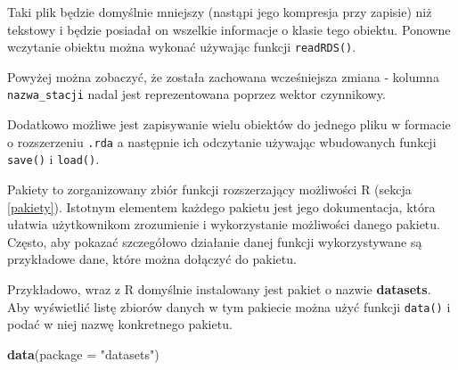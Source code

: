 \documentclass[paper=6in:9in,pagesize=pdftex,headinclude=on,footinclude=on,10pt]{scrbook}
\makeatletter
\newenvironment{Shaded}{\begin{snugshade}}{\end{snugshade}}
\newcommand{\CommentTok}[1]{\textcolor[rgb]{0.56,0.35,0.01}{\textit{#1}}}
\newcommand{\DataTypeTok}[1]{\textcolor[rgb]{0.13,0.29,0.53}{#1}}
\newcommand{\KeywordTok}[1]{\textcolor[rgb]{0.13,0.29,0.53}{\textbf{#1}}}
\newcommand{\NormalTok}[1]{#1}
\newcommand{\StringTok}[1]{\textcolor[rgb]{0.31,0.60,0.02}{#1}}
\newenvironment{kframe}{%
\medskip{}
\setlength{\fboxsep}{.8em}
 \def\at@end@of@kframe{}%
 \ifinner\ifhmode%
  \def\at@end@of@kframe{\end{minipage}}%
  \begin{minipage}{\columnwidth}%
 \fi\fi%
 \def\FrameCommand##1{\hskip\@totalleftmargin \hskip-\fboxsep
 \colorbox{shadecolor}{##1}\hskip-\fboxsep
     \hskip-\linewidth \hskip-\@totalleftmargin \hskip\columnwidth}%
 \MakeFramed {\advance\hsize-\width
   \@totalleftmargin\z@ \linewidth\hsize
   \@setminipage}}%
 {\par\unskip\endMakeFramed%
 \at@end@of@kframe}
\newenvironment{rmdblock}[1]
  {
  \begin{itemize}
  \renewcommand{\labelitemi}{
    \raisebox{-.7\height}[0pt][0pt]{
      {\setkeys{Gin}{width=3em,keepaspectratio}\texttt{[image: images/\#1]}}
    }
  }
  \setlength{\fboxsep}{1em}
  \begin{kframe}
  \item
  }
  {
  \end{kframe}
  \end{itemize}
  }
\newenvironment{rmdinfo}
  {\begin{rmdblock}{compass}}
  {\end{rmdblock}}
\makeatother
\begin{document}
Taki plik będzie domyślnie mniejszy (nastąpi jego kompresja przy zapisie) niż tekstowy i będzie posiadał on wszelkie informacje o klasie tego obiektu.
Ponowne wczytanie obiektu można wykonać używając funkcji \texttt{readRDS()}.

\begin{Shaded}
\end{Shaded}

Powyżej można zobaczyć, że została zachowana wcześniejsza zmiana - kolumna \texttt{nazwa\_stacji} nadal jest reprezentowana poprzez wektor czynnikowy.

\begin{rmdinfo}
Dodatkowo możliwe jest zapisywanie wielu obiektów do jednego pliku w formacie o rozszerzeniu \texttt{.rda} a następnie ich odczytanie używając wbudowanych funkcji \texttt{save()} i \texttt{load()}.
\end{rmdinfo}

Pakiety to zorganizowany zbiór funkcji rozszerzający możliwości R (sekcja \ref{pakiety}).
Istotnym elementem każdego pakietu jest jego dokumentacja, która ułatwia użytkownikom zrozumienie i wykorzystanie możliwości danego pakietu.
Często, aby pokazać szczegółowo działanie danej funkcji wykorzystywane są przykładowe dane, które można dołączyć do pakietu.

Przykładowo, wraz z R domyślnie instalowany jest pakiet o nazwie \textbf{datasets}.
Aby wyświetlić listę zbiorów danych w tym pakiecie można użyć funkcji \texttt{data()} i podać w niej nazwę konkretnego pakietu.

\begin{Shaded}
\begin{Highlighting}[]
\KeywordTok{data}\NormalTok{(}\DataTypeTok{package =} \StringTok{"datasets"}\NormalTok{)}
\end{Highlighting}
\end{Shaded}
\end{document}
